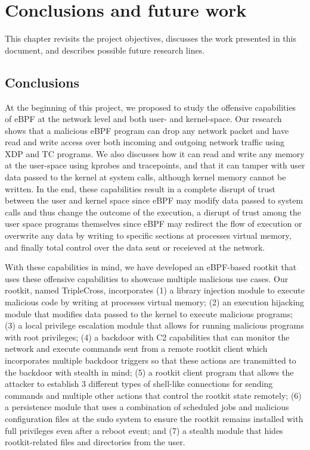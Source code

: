 \chapter{Conclusions and future work}
This chapter revisits the project objectives, discusses the work presented
in this document, and describes possible future research lines.

\section{Conclusions}
At the beginning of this project, we proposed to study the offensive
capabilities of eBPF at the network level and both user- and kernel-space.
Our research shows that a malicious eBPF program can drop any network
packet and have read and write access over both incoming and outgoing
network traffic using XDP and TC programs. We also discusses how it can
read and write any memory at the user-space using kprobes and tracepoints,
and that it can tamper with user data passed to the kernel at system calls,
although kernel memory cannot be written. In the end, these capabilities
result in a complete disrupt of trust between the user and kernel space
since eBPF may modify data passed to system calls and thus change the
outcome of the execution, a disrupt of trust among the user space programs
themselves since eBPF may redirect the flow of execution or overwrite any
data by writing to specific sections at processes virtual memory, and
finally total control over the data sent or receieved at the network.

With these capabilities in mind, we have developed an eBPF-based rootkit
that uses these offensive capabilities to showcase multiple malicious use
cases. Our rootkit, named TripleCross, incorporates (1) a library injection
module to execute malicious code by writing at processes virtual memory;
(2) an execution hijacking module that modifies data passed to the kernel
to execute malicious programs; (3) a local privilege escalation module that
allows for running malicious programs with root privileges; (4) a
backdoor with C2 capabilities that can monitor the network and execute
commands sent from a remote rootkit client which incorporates multiple
backdoor triggers so that these actions are transmitted to the backdoor
with stealth in mind; (5) a rootkit client program that allows the attacker
to establish 3 different types of shell-like connections for sending
commands and multiple other actions that control the rootkit state
remotely; (6) a persistence module that uses a combination of scheduled
jobs and malicious configuration files at the sudo system to ensure the
rootkit remains installed with full privileges even after a reboot event;
and (7) a stealth module that hides rootkit-related files and directories
from the user.

